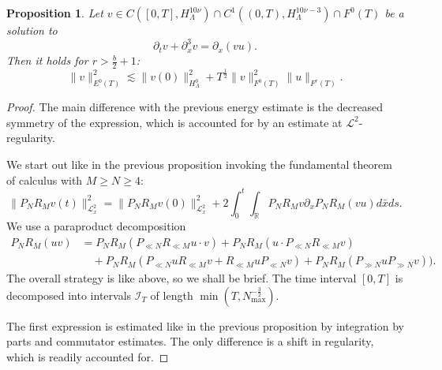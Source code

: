 \documentclass{amsart}
\newtheorem{proposition}[theorem]{Proposition}
\theoremstyle{definition}
\newcommand{\R}{\mathbb{R}}
\begin{document}
\begin{proposition}
\label{prop:EnergyEstimateDifferences}
Let $v \in C([0,T],H^{10\nu}_\Lambda) \cap C^1((0,T),H^{10 \nu-3}_{\Lambda}) \cap F^0(T)$ be a solution to
\begin{equation}
\label{eq:DifferenceEquation}
\partial_t v +  \partial_x^3 v = \partial_x (v u).
\end{equation}
Then it holds for $r> \frac{b}{2}+1$:
\begin{equation}
\label{eq:EnergyEstimateDifferences}
\| v \|^2_{E^0(T)} \lesssim \| v(0) \|^2_{H^0_{\Lambda}} + T^{\frac{1}{2}} \| v \|^2_{F^0(T)} \| u \|_{F^r(T)}.
\end{equation}
\end{proposition}
\begin{proof}
The main difference with the previous energy estimate is the decreased symmetry of the expression, which is accounted for by an estimate at $\mathcal{L}^2$-regularity.

We start out like in the previous proposition invoking the fundamental theorem of calculus with $M \geq N \geq 4$:
\begin{equation*}
\| P_N R_M v(t) \|^2_{\mathcal{L}^2_x} = \| P_N R_M v(0) \|^2_{\mathcal{L}^2_x} + 2 \int_0^t \int_{\R} P_N R_M v \partial_x P_N R_M (v u) d\bar{x} ds.
\end{equation*}
We use a paraproduct decomposition
\begin{equation*}
\begin{split}
P_N R_M (u v) &= P_N R_M (P_{\ll N} R_{\ll M} u \cdot v) + P_N R_M (u \cdot P_{\ll N} R_{\ll M} v) \\
&\quad + P_N R_M (P_{\ll N} u R_{\ll M} v + R_{\ll M} u P_{\ll N} v) + P_N R_M (P_{\gg N} u P_{\gg N} v)).
\end{split}
\end{equation*}
The overall strategy is like above, so we shall be brief. The time interval $[0,T]$ is decomposed into intervals $\mathcal{I}_T$ of length $\min(T,N_{\max}^{-\frac{3}{2}})$.

The first expression is estimated like in the previous proposition by integration by parts and commutator estimates. The only difference is a shift in regularity, which is readily accounted for.


\end{proof}
\end{document}

